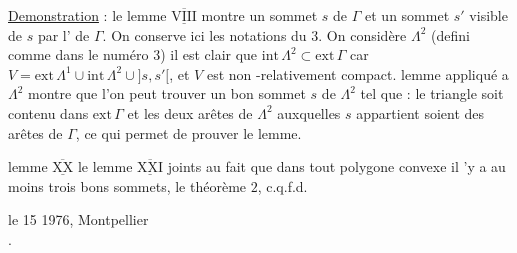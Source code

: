 \uline{Demonstration} : le lemme $\overline{\underline{\mathrm{VIII}}}$ montre   un sommet $s$ de $\Gamma$ et un sommet $s'$ visible de $s$ par l' de $\Gamma$. On conserve ici les notations du  $3$. On considère $\Lambda^2$ (defini comme dans le numéro $3$) il est clair  %
que $\mathrm{int}\,\Lambda^2\subset\mathrm{ext}\,\Gamma$ car $V=\mathrm{ext}\,\Lambda^1\cup\mathrm{int}\,\Lambda^2\cup{]s,s'[}$, et $V$ est non -relativement compact.  lemme  appliqué a $\Lambda^2$ montre que l'on peut trouver un  bon sommet $s$ de $\Lambda^2$ tel que : le triangle  soit contenu dans $\mathrm{ext}\,\Gamma$ et les deux arêtes de $\Lambda^2$ auxquelles  %
$s$ appartient soient des arêtes de $\Gamma$, ce qui permet de prouver le lemme.

 lemme $\overline{\underline{\mathrm{XX}}}$ le lemme $\overline{\underline{\mathrm{XXI}}}$ joints au fait que dans tout polygone convexe il 'y a au moins trois bons sommets,  le théorème $2$, c.q.f.d.

\begin{flushright}
le 15  1976, Montpellier\\
.
\end{flushright}
